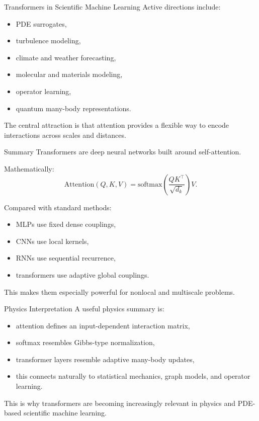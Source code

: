 \documentclass{beamer}
\begin{document}
\begin{frame}{Transformers in Scientific Machine Learning}
  Active directions include:
  \begin{itemize}
  \item PDE surrogates,
  \item turbulence modeling,
  \item climate and weather forecasting,
  \item molecular and materials modeling,
  \item operator learning,
  \item quantum many-body representations.
  \end{itemize}

  The central attraction is that attention provides a flexible way to encode interactions across scales and distances.
\end{frame}

\begin{frame}{Summary}
  Transformers are deep neural networks built around self-attention.

  Mathematically:
  \[
  \mathrm{Attention}(Q,K,V)
  =
  \mathrm{softmax}\!\left(\frac{QK^\top}{\sqrt{d_k}}\right)V.
  \]

  Compared with standard methods:
  \begin{itemize}
  \item MLPs use fixed dense couplings,
  \item CNNs use local kernels,
  \item RNNs use sequential recurrence,
  \item transformers use adaptive global couplings.
  \end{itemize}

  This makes them especially powerful for nonlocal and multiscale problems.
\end{frame}

\begin{frame}{Physics Interpretation}
  A useful physics summary is:
  \begin{itemize}
  \item attention defines an input-dependent interaction matrix,
  \item softmax resembles Gibbs-type normalization,
  \item transformer layers resemble adaptive many-body updates,
  \item this connects naturally to statistical mechanics, graph models, and operator learning.
  \end{itemize}

  This is why transformers are becoming increasingly relevant in physics and PDE-based scientific machine learning.
\end{frame}
\end{document}
